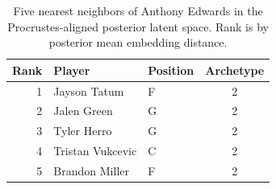 \begin{table}[htbp]
  \centering\small
  \begin{tabular}{rllc}
    \toprule
    Rank & Player & Position & Archetype \\
    \midrule
    1 & Jayson Tatum & F & 2 \\
    2 & Jalen Green & G & 2 \\
    3 & Tyler Herro & G & 2 \\
    4 & Tristan Vukcevic & C & 2 \\
    5 & Brandon Miller & F & 2 \\
    \bottomrule
  \end{tabular}
  \caption{Five nearest neighbors of Anthony Edwards in the Procrustes-aligned posterior latent space. Rank is by posterior mean embedding distance.}
  \label{tab:Anthony_Edwards_neighbors}
\end{table}


